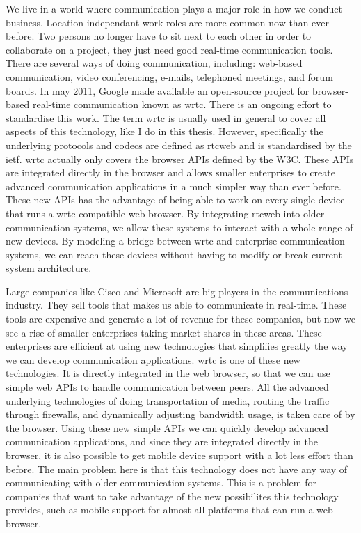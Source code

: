 We live in a world where communication plays a major role in how we conduct business. Location independant work roles are more common now than ever before. Two persons no longer have to sit next to each other in order to collaborate on a project, they just need good real-time communication tools. There are several ways of doing communication, including: web-based communication, video conferencing, e-mails, telephoned meetings, and forum boards. In may 2011, Google made available an open-source project for browser-based real-time communication known as \gls{wrtc}\cite{google-release-of-webrtc}. There is an ongoing effort to standardise this work. The term \gls{wrtc} is usually used in general to cover all aspects of this technology, like I do in this thesis. However, specifically the underlying protocols and codecs are defined as \gls{rtcweb} and is standardised by the \gls{ietf}\cite{ietf}. \gls{wrtc} actually only covers the browser APIs defined by the W3C\cite{w3c}. These APIs are integrated directly in the browser and allows smaller enterprises to create advanced communication applications in a much simpler way than ever before. These new APIs has the advantage of being able to work on every single device that runs a \gls{wrtc} compatible web browser. By integrating \gls{rtcweb} into older communication systems, we allow these systems to interact with a whole range of new devices. By modeling a bridge between \gls{wrtc} and enterprise communication systems, we can reach these devices without having to modify or break current system architecture.

Large companies like Cisco and Microsoft are big players in the communications industry. They sell tools that makes us able to communicate in real-time. These tools are expensive and generate a lot of revenue for these companies, but now we see a rise of smaller enterprises taking market shares in these areas. These enterprises are efficient at using new technologies that simplifies greatly the way we can develop communication applications. \gls{wrtc} is one of these new technologies. It is directly integrated in the web browser, so that we can use simple web APIs to handle communication between peers. All the advanced underlying technologies of doing transportation of media, routing the traffic through firewalls, and dynamically adjusting bandwidth usage, is taken care of by the browser. Using these new simple APIs we can quickly develop advanced communication applications, and since they are integrated directly in the browser, it is also possible to get mobile device support with a lot less effort than before. The main problem here is that this technology does not have any way of communicating with older communication systems. This is a problem for companies that want to take advantage of the new possibilites this technology provides, such as mobile support for almost all platforms that can run a web browser.

